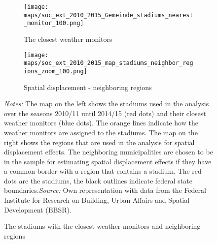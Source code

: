 \begin{landscape}
	\vspace*{\fill}
	\begin{figure}[H]\centering
		\begin{subfigure}[h]{0.37\linewidth}\centering\caption{The closest weather monitors}
			\texttt{[image: maps/soc\_ext\_2010\_2015\_Gemeinde\_stadiums\_nearest\_monitor\_100.png]}
		\end{subfigure}\hspace{0.05\linewidth}
		\begin{subfigure}[h]{0.37\linewidth}\centering\caption{Spatial displacement - neighboring regions}
			\texttt{[image: maps/soc\_ext\_2010\_2015\_map\_stadiums\_neighbor\_regions\_zoom\_100.png]}
		\end{subfigure}
		\scriptsize
		\begin{minipage}{0.95\linewidth}
			\caption{The stadiums with the closest weather monitors and neighboring regions}\label{fig_soc_ext:map_gem_stadiums_monitor_and_neighboring_regions}
			\scriptsize{\emph{Notes:} The map on the left shows the stadiums used in the analysis over the seasons 2010/11 until 2014/15 (red dots) and their closest weather monitors (blue dots). The orange lines indicate how the weather monitors are assigned to the stadiums. The map on the right shows the regions that are used in the analysis for spatial displacement effects. The neighboring municipalities are chosen to be in the sample for estimating spatial displacement effects if they have a common border with a region that contains a stadium. The red dots are the stadiums, the black outlines indicate federal state boundaries.\newline \emph{Source:} Own representation with data from the Federal Institute for Research on Building, Urban Affairs and Spatial Development (BBSR).}
		\end{minipage}
	\end{figure}
	\vspace*{\fill}
\end{landscape}
\clearpage